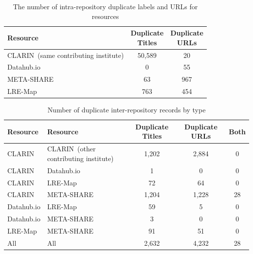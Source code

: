 \documentclass[smallextended]{svjour3}       %
\begin{document}
\begin{table}
    \begin{center}
    \begin{tabular}{l|cc}
        Resource   & \thead{Duplicate \\ Titles} & \thead{Duplicate \\ URLs} \\
        \hline                                                            
        CLARIN{\tiny~(same contributing institute)}     & 50,589           & 20          \\   
        Datahub.io & 0                & 55             \\
        META-SHARE & 63               & 967            \\
        LRE-Map    & 763              & 454            \\
    \end{tabular}
    \end{center}
    \caption{\label{tab:self-dupes}The number of intra-repository duplicate labels and URLs for
    resources}
\end{table}



\begin{table}
    \begin{center}
        \begin{tabular}{ll|ccc}
        Resource    & Resource    & Duplicate Titles & Duplicate URLs & Both \\
        \hline                                                                  
        CLARIN      & CLARIN{\tiny~(other contributing institute)}      & 1,202            & 2,884          & 0    \\
        CLARIN      & Datahub.io  & 1                & 0              & 0    \\
        CLARIN      & LRE-Map     & 72               & 64             & 0    \\
        CLARIN      & META-SHARE  & 1,204            & 1,228          & 28    \\
        Datahub.io  & LRE-Map     & 59               & 5              & 0    \\
        Datahub.io  & META-SHARE  & 3                & 0              & 0    \\
        LRE-Map     & META-SHARE  & 91               & 51             & 0    \\
        \hline
        All         & All         & 2,632            & 4,232          & 28   \\
        \end{tabular}
    \end{center}
    \caption{\label{tab:dupes}Number of duplicate inter-repository records by type}
\end{table}
\end{document}
